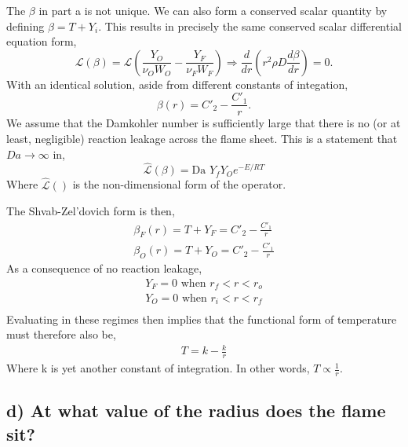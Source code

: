 \documentclass{article}
\begin{document}
The $\beta$ in part a is not unique. We can also form a conserved scalar
quantity by defining $\beta = T + Y_i$. This results in precisely the
same conserved scalar differential equation form, 
\begin{equation*}
\mathcal{L}\left(\beta \right) = \mathcal{L}\left( \frac{Y_O}{\nu_O W_O}
	    - \frac{Y_F}{\nu_F W_F} \right) \Rightarrow \frac{d}{dr}\left( r^2
	    \rho D \frac{d \beta}{dr}\right) = 0 .
\end{equation*}
With an identical solution, aside from different constants of
integation,
\begin{equation*}
\beta(r) = C'_2 - \frac{C'_1}{ r }.
\end{equation*}
We assume that the Damkohler number is sufficiently large that there is
no (or at least, negligible) reaction leakage across the flame
sheet. This is a statement that $Da \rightarrow \infty$ in, 
\begin{equation*}
 \mathcal{\hat L}\left(\beta \right) = \text{Da } Y_f Y_O e^{-E/RT}
\end{equation*}
Where $\mathcal{\hat L}\left( \right)$ is the non-dimensional form of
the operator. 


The Shvab-Zel'dovich form is then,
\begin{eqnarray*}
 \beta_F(r) = T + Y_F = C'_2 - \frac{C'_1}{ r } \\
 \beta_O(r) = T + Y_O = C'_2 - \frac{C'_1}{ r }
\end{eqnarray*}
As a consequence of no reaction leakage, 
\begin{eqnarray*}
 Y_F = 0 \text{ when } r_f < r < r_o \\
 Y_O = 0 \text{ when } r_i < r < r_f \\
\end{eqnarray*}
Evaluating in these regimes then implies that the functional form of
temperature must therefore also be,  
\begin{eqnarray*}
 T = k - \frac{k}{ r } 
\end{eqnarray*}
Where k is yet another constant of integration. In other words, $T
\propto \frac{1}{r} $.  

\newpage
\subsection*{d) At what value of the radius does the flame sit?}
\end{document}
